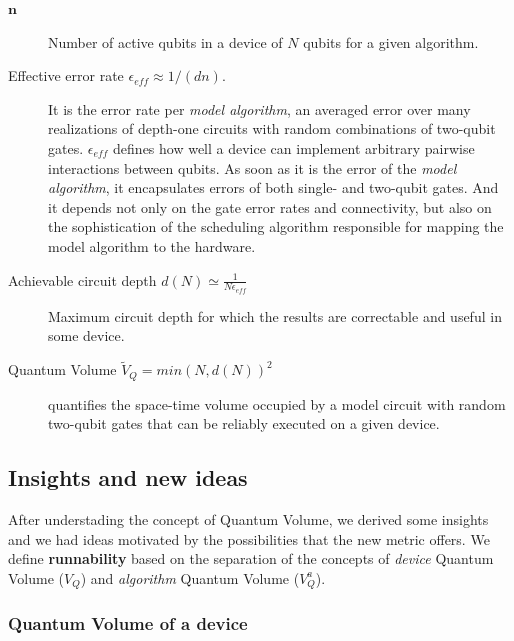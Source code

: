 \documentclass[11pt]{article}
\begin{document}
\begin{description}
\item[{\(\textbf{n}\)}] Number of active qubits in a device of \(N\) qubits for a given algorithm.
\end{description}


\begin{description}
\item[{Effective error rate \(\epsilon_{eff} \approx 1/(d n)\).}] It is the error rate per \emph{model algorithm}, an averaged error over many realizations of depth-one circuits with random combinations of two-qubit gates. \(\epsilon_{eff}\) defines how well a device can implement arbitrary pairwise interactions between qubits. As soon as it is the error of the \emph{model algorithm}, it encapsulates errors of both single- and two-qubit gates. And it depends not only on the gate error rates and connectivity, but also on the sophistication of the scheduling algorithm responsible for mapping the model algorithm to the hardware.

\item[{Achievable circuit depth \(d(N) \simeq \frac{1}{N \epsilon_{eff}}\)}] Maximum circuit depth for which the results are correctable and useful in some device.
\end{description}

\begin{description}
\item[{Quantum Volume \(\tilde{V}_Q = min (N, d(N))^2\)}] quantifies the space-time volume occupied by a model circuit with random two-qubit gates that can be reliably executed on a given device.
\end{description}

\subsection{Insights and new ideas}
\label{sec:org9bba458}

After understading the concept of Quantum Volume, we derived some insights and we had ideas motivated by the possibilities that the new metric offers. 
We define \textbf{runnability} based on the separation of the concepts of \emph{device} Quantum Volume (\(V_Q\)) and \emph{algorithm} Quantum Volume (\(V^a_Q\)).

\subsubsection{Quantum Volume of a device}
\label{sec:org09a36bb}
\end{document}
